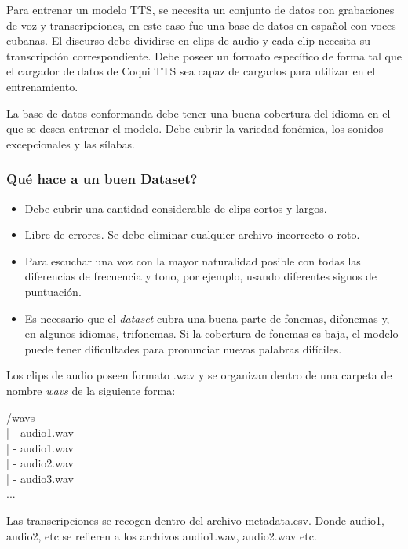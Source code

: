 Para entrenar un modelo TTS, se necesita un conjunto de datos con grabaciones de voz y transcripciones, en este caso fue una base de datos en español con voces cubanas. El discurso debe dividirse en clips de audio y cada clip necesita su transcripción correspondiente. Debe poseer un formato específico de forma tal que el cargador de datos de Coqui TTS sea capaz de cargarlos para utilizar en el entrenamiento.    

La base de datos conformanda debe tener una buena cobertura del idioma en el que se desea entrenar el modelo. Debe cubrir la variedad fonémica, los sonidos excepcionales y las sílabas. 

\subsubsection{Qué hace a un buen Dataset?}

\begin{itemize}
	\item Debe cubrir una cantidad considerable de clips cortos y largos.
	\item Libre de errores. Se debe eliminar cualquier archivo incorrecto o roto. 
	\item Para escuchar una voz con la mayor naturalidad posible con todas las diferencias de frecuencia y tono, por ejemplo, usando diferentes signos de puntuación.
	\item Es necesario que el \textit{dataset} cubra una buena parte de fonemas, difonemas y, en algunos idiomas, trifonemas. Si la cobertura de fonemas es baja, el modelo puede tener dificultades para pronunciar nuevas palabras difíciles.
	
\end{itemize}

Los clips de audio poseen formato .wav y se organizan dentro de una carpeta de nombre \textit{wavs} de la siguiente forma:

\begin{center}
	/wavs\\
	| - audio1.wav\\
	| - audio1.wav\\
	| - audio2.wav\\
	| - audio3.wav\\
	...
\end{center}

Las transcripciones se recogen dentro del archivo metadata.csv. Donde audio1, audio2, etc se refieren a los archivos audio1.wav, audio2.wav etc.

